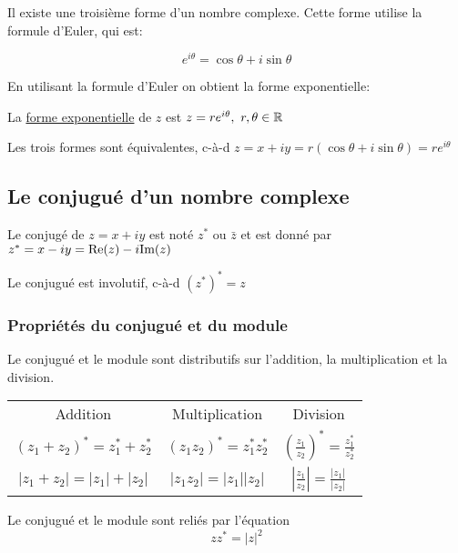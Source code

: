 Il existe une troisième forme d'un nombre complexe. Cette forme utilise la formule d'Euler, qui est:
\begin{theorem}
    \[ e^{i\theta} = \cos{\theta} + i\sin{\theta} \]
\end{theorem}
En utilisant la formule d'Euler on obtient la forme exponentielle:
\begin{definition}
    La \underline{forme exponentielle} de $z$ est $z = re^{i\theta}, \ r, \theta \in \mathbb{R}$
\end{definition}
\begin{note}
    Les trois formes sont équivalentes, c-à-d $z = x + iy = r(\cos{\theta} + i\sin{\theta}) = re^{i\theta}$
\end{note}

\begingroup
\renewcommand{\arraystretch}{1.5}

\subsection{Le conjugué d'un nombre complexe}
\begin{definition}
    Le conjugé de $z = x + iy$ est noté $z^*$ ou $\bar{z}$ et est donné par $z^* = x - iy = \text{Re}(z) - i\text{Im}(z)$
\end{definition}
\begin{remark}
    Le conjugué est involutif, c-à-d $\left(z^* \right)^* = z$
\end{remark}

\subsubsection{Propriétés du conjugué et du module}
Le conjugué et le module sont distributifs sur l'addition, la multiplication et la division.
\begin{center}
    \begin{tabular}{c@{\hskip 1in} c@{\hskip 1in} c}
        Addition                                   & Multiplication                          & Division                                                  \\
        $\left(z_1 + z_2\right)^* = z_1^* + z_2^*$ & $\left(z_1z_2\right)^* = z_1^{*} z_2^*$ & $\left( \frac{z_1}{z_2}\right)^{*} = \frac{z_1^*}{z_2^*}$ \\
        $\left|z_1 + z_2\right| = |z_1| + |z_2|$   & $\left|z_1z_2\right| = |z_1||z_2|$      & $\left| \frac{z_1}{z_2}\right| = \frac{|z_1|}{|z_2|}$
    \end{tabular}
\end{center}
Le conjugué et le module sont reliés par l'équation
\[
    zz^* = |z|^2
\]
